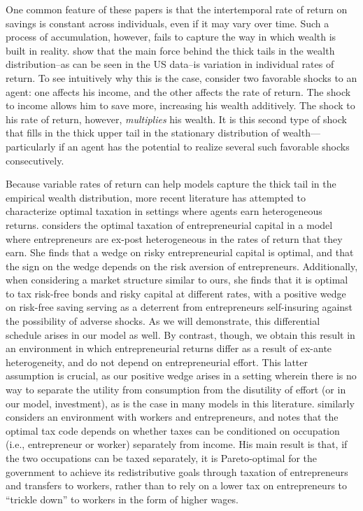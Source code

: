 \documentclass[11pt]{article}
\begin{document}
One common feature of these papers is that the intertemporal rate of return on savings is constant across individuals, even if it may vary over time. Such a process of accumulation, however, fails to capture the way in which wealth is built in reality. \cite{benhabib2011distribution} show that the main force behind the thick tails in the wealth distribution--as can be seen in the US data--is variation in individual rates of return. To see intuitively why this is the case, consider two favorable shocks to an agent: one affects his income, and the other affects the rate of return. The shock to income allows him to save more, increasing his wealth additively. The shock to his rate of return, however, \textit{multiplies} his wealth. It is this second type of shock that fills in the thick upper tail in the stationary distribution of wealth---particularly if an agent has the potential to realize several such favorable shocks consecutively.

Because variable rates of return can help models capture the thick tail in the empirical wealth distribution, more recent literature has attempted to characterize optimal taxation in settings where agents earn heterogeneous returns. \cite{albanesi2006optimal} considers the optimal taxation of entrepreneurial capital in a model where entrepreneurs are ex-post heterogeneous in the rates of return that they earn. She finds that a wedge on risky entrepreneurial capital is optimal, and that the sign on the wedge depends on the risk aversion of entrepreneurs. Additionally, when considering a market structure similar to ours, she finds that it is optimal to tax risk-free bonds and risky capital at different rates, with a positive wedge on risk-free saving serving as a deterrent from entrepreneurs self-insuring against the possibility of adverse shocks. As we will demonstrate, this differential schedule arises in our model as well. By contrast, though, we obtain this result in an environment in which entrepreneurial returns differ as a result of ex-ante heterogeneity, and do not depend on entrepreneurial effort. This latter assumption is crucial, as our positive wedge arises in a setting wherein there is no way to separate the utility from consumption from the disutility of effort (or in our model, investment), as is the case in many models in this literature. \cite{scheuer2014entrepreneurial} similarly considers an environment with workers and entrepreneurs, and notes that the optimal tax code depends on whether taxes can be conditioned on occupation (i.e., entrepreneur or worker) separately from income. His main result is that, if the two occupations can be taxed separately, it is Pareto-optimal for the government to achieve its redistributive goals through taxation of entrepreneurs and transfers to workers, rather than to rely on a lower tax on entrepreneurs to ``trickle down'' to workers in the form of higher wages. 
\end{document}

